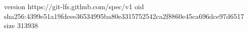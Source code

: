 version https://git-lfs.github.com/spec/v1
oid sha256:4399e51a19fdeee36534995ba80e3315752542ca2f8860e45ca696dce97d6517
size 313938

